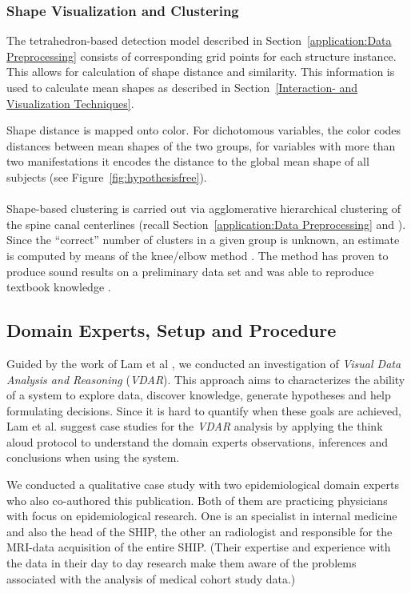 \documentclass[journal]{style/vgtc} 			          %
\newcommand{\com}[1]{\textcolor{orange}{\uline{#1}}}
\begin{document}
\subsubsection{Shape Visualization and Clustering}
%
The tetrahedron-based detection model described in Section~\ref{application:Data Preprocessing} consists of corresponding grid points for each structure instance.
%
This allows for calculation of shape distance and similarity.
%
This information is used to calculate mean shapes as described in Section~\ref{Interaction- and Visualization Techniques}.

Shape distance is mapped onto color.
%
For dichotomous variables, the color codes distances between mean shapes of the two groups, for variables with more than two manifestations it encodes the distance to the global mean shape of all subjects (see Figure~\ref{fig:hypothesisfree}).
\\\\
Shape-based clustering is carried out via agglomerative hierarchical clustering of the spine canal centerlines (recall Section~\ref{application:Data Preprocessing} and \cite{Klemm2013VMV}).
%
Since the ``correct'' number of clusters in a given group is unknown, an estimate is computed by means of the knee/elbow method \cite{Salvador2004}.
%
The method has proven to produce sound results on a preliminary data set and was able to reproduce textbook knowledge \cite{Klemm2013VMV}.
\subsection{Domain Experts, Setup and Procedure}
%
%
Guided by the work of Lam et al \cite{Lam2012}, we conducted an investigation of \emph{Visual Data Analysis and Reasoning} (\emph{VDAR}).
%
This approach aims to characterizes the ability of a system to explore data, discover knowledge, generate hypotheses and help formulating decisions.
%
Since it is hard to quantify when these goals are achieved, Lam et al. suggest case studies for the \emph{VDAR} analysis by applying the think aloud protocol to understand the domain experts observations, inferences and conclusions when using the system.

We conducted a qualitative case study with two epidemiological domain experts who also co-authored this publication.
%
Both of them are practicing physicians with focus on epidemiological research.
%
One is an specialist in internal medicine and also the head of the SHIP, the other an radiologist and responsible for the MRI-data acquisition of the entire SHIP. %
%
(Their expertise and experience with the data in their day to day research make them aware of the problems associated with the analysis of medical cohort study data.)
%
\end{document}
